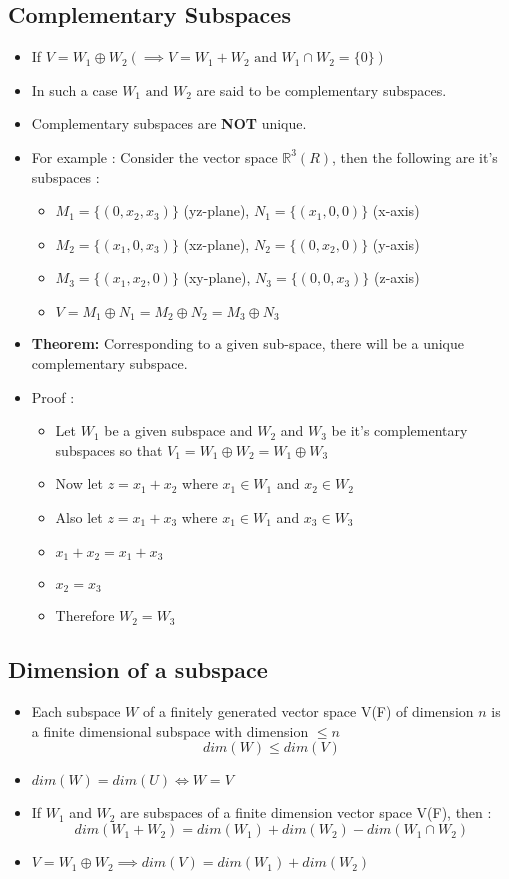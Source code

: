 \documentclass[twoside]{article}
\begin{document}
	\subsection{Complementary Subspaces}
	\begin{itemize}
		\item If $V = W_1 \oplus W_2 (\implies V = W_1 + W_2  \text{ and } W_1 \cap W_2 = \{0\})$
		\item In such a case $W_1 \text{ and } W_2$ are said to be complementary subspaces.
		\item Complementary subspaces are {\bf NOT} unique.
		\item For example : Consider the vector space $\mathbb{R}^{3}(R)$, then the following are it's subspaces :
		\begin{itemize}
			\item $M_1 = \{(0,x_2,x_3)\}$ (yz-plane), $N_1 = \{(x_1,0,0)\}$ (x-axis)
			\item $M_2 = \{(x_1,0,x_3)\}$ (xz-plane), $N_2 = \{(0,x_2,0)\}$ (y-axis)
			\item $M_3 = \{(x_1,x_2,0)\}$ (xy-plane), $N_3 = \{(0,0,x_3)\}$ (z-axis)
			\item $V = M_1 \oplus N_1 = M_2 \oplus N_2 = M_3 \oplus N_3$
		\end{itemize}
		\item {\bf Theorem: } Corresponding to a given sub-space, there will be a unique complementary subspace.
		\item Proof :
		\begin{itemize}
			\item Let $W_1$ be a given subspace and $W_2$ and $W_3$ be it's complementary subspaces so that $V_1 = W_1 \oplus W_2 = W_1 \oplus W_3$
			\item Now let $z = x_1 + x_2$ where $x_1 \in W_1$ and $x_2 \in W_2$
			\item Also let $z = x_1 + x_3$ where $x_1 \in W_1$ and $x_3 \in W_3$
			\item $x_1 + x_2 = x_1 + x_3$
			\item $x_2 = x_3$
			\item Therefore $W_2 = W_3$
		\end{itemize}
	\end{itemize}
	\subsection{Dimension of a subspace}
	\begin{itemize}
		\item Each subspace $W$ of a finitely generated vector space V(F) of dimension $n$ is a finite dimensional subspace with dimension $\leq n$ 
		\[dim(W) \leq dim(V)\]
		\item $dim(W) = dim(U) \iff W = V$
		\item If $W_1$ and $W_2$ are subspaces of a finite dimension vector space V(F), then :
		\[dim(W_1 + W_2) = dim(W_1) + dim(W_2) - dim(W_1 \cap W_2)\]
		\item $V = W_1 \oplus W_2 \implies dim(V) = dim(W_1) + dim(W_2)$ 
	\end{itemize}
\end{document}
